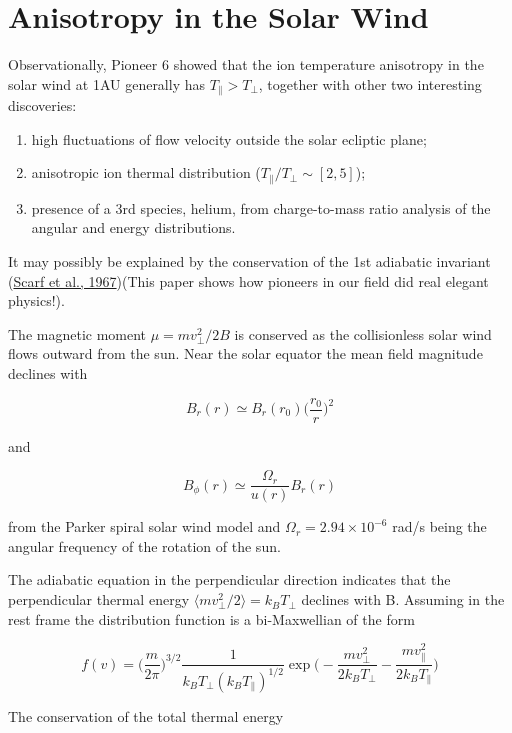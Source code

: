 \documentclass[
  notoc %
]{tufte-book}
\providecommand{\tightlist}{%
  \setlength{\itemsep}{0pt}\setlength{\parskip}{0pt}
}
\begin{document}
\hypertarget{anisotropy-in-the-solar-wind}{%
\section{Anisotropy in the Solar
Wind}\label{anisotropy-in-the-solar-wind}}

Observationally, Pioneer 6 showed that the ion temperature anisotropy in
the solar wind at 1AU generally has \(T_\parallel > T_\perp\), together
with other two interesting discoveries:

\begin{enumerate}
\def\labelenumi{\arabic{enumi}.}
\tightlist
\item
  high fluctuations of flow velocity outside the solar ecliptic plane;
\item
  anisotropic ion thermal distribution
  (\(T_\parallel / T_\perp \sim [2,5]\));
\item
  presence of a 3rd species, helium, from charge-to-mass ratio analysis
  of the angular and energy distributions.
\end{enumerate}

It may possibly be explained by the conservation of the 1st adiabatic
invariant (\protect\hyperlink{ref-scarf1967plasma}{Scarf et al.,
1967})(This paper shows how pioneers in our field did real elegant
physics!).

The magnetic moment \(\mu = m v_\perp^2/2B\) is conserved as the
collisionless solar wind flows outward from the sun. Near the solar
equator the mean field magnitude declines with

\[
B_r(r) \simeq B_r(r_0)\Big( \frac{r_0}{r} \Big)^2
\]

and

\[
B_\phi(r) \simeq \frac{\Omega_r}{u(r)}B_r(r)
\]

from the Parker spiral solar wind model and
\(\Omega_r = 2.94\times 10^{-6}\) rad/s being the angular frequency of
the rotation of the sun.

The adiabatic equation in the perpendicular direction indicates that the
perpendicular thermal energy
\(\langle m v_\perp^2/2\rangle = k_B T_\perp\) declines with B. Assuming
in the rest frame the distribution function is a bi-Maxwellian of the
form

\[
f(v) = \Big( \frac{m}{2\pi}  \Big)^{3/2}\frac{1}{k_B T_\perp (k_B T_\parallel)^{1/2}} \exp\Big( -\frac{mv_\perp^2}{2k_B T_\perp} -\frac{mv_\parallel^2}{2k_B T_\parallel} \Big)
\]

The conservation of the total thermal energy
\end{document}
